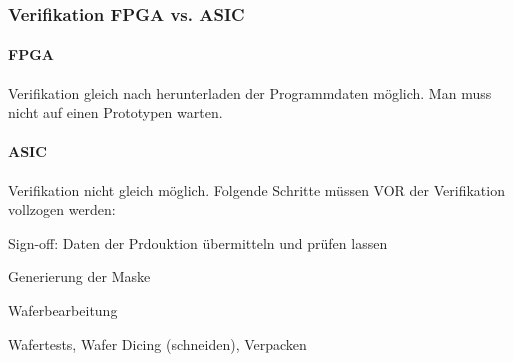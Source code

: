 \subsubsection{Verifikation FPGA vs. ASIC}
\paragraph{FPGA}
Verifikation gleich nach herunterladen der Programmdaten möglich. Man muss nicht auf einen Prototypen warten.
\paragraph{ASIC}
Verifikation nicht gleich möglich. Folgende Schritte müssen VOR der Verifikation vollzogen werden: 
\begin{compactitem}
        \item Sign-off: Daten der Prdouktion übermitteln und prüfen lassen
        \item Generierung der Maske 
        \item Waferbearbeitung
        \item Wafertests, Wafer Dicing (schneiden), Verpacken
\end{compactitem}
